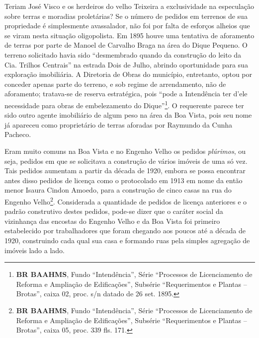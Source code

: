 Teriam José Visco e os herdeiros do velho Teixeira a exclusividade na especulação sobre terras e moradias proletárias? Se o número de pedidos em terrenos de sua propriedade é simplesmente avassalador, não foi por falta de esforços alheios que se viram nesta situação oligopolista. Em 1895 houve uma tentativa de aforamento de terras por parte de Manoel de Carvalho Braga na área do Dique Pequeno. O terreno solicitado havia sido ``desmembrado quando da construção do leito da Cia. Trilhos Centrais'' na estrada Dois de Julho, abrindo oportunidade para sua exploração imobiliária. A Diretoria de Obras do município, entretanto, optou por conceder apenas parte do terreno, e sob regime de arrendamento, não de aforamento; tratava-se de reserva estratégica, pois ``pode a Intendência ter d'ele necessidade para obras de embelezamento do Dique''\footnote{\textbf{BR BAAHMS}, Fundo ``Intendência'', Série ``Processos de Licenciamento de Reforma e Ampliação de Edificações'', Subsérie ``Requerimentos e Plantas -- Brotas'', caixa 02, proc. s/n datado de 26 set. 1895.}. O requerente parece ter sido outro agente imobiliário de algum peso na área da Boa Vista, pois seu nome já apareceu como proprietário de terras aforadas por Raymundo da Cunha Pacheco.


Eram muito comuns na Boa Vista e no Engenho Velho os pedidos \textit{plúrimos}, ou seja, pedidos em que se solicitava a construção de vários imóveis de uma só vez. Tais pedidos aumentam a partir da década de 1920, embora se possa encontrar antes disso pedidos de licença como o protocolado em 1913 em nome da então menor Isaura Cindon Amoedo, para a construção de cinco casas na rua do Engenho Velho\footnote{\textbf{BR BAAHMS}, Fundo ``Intendência'', Série ``Processos de Licenciamento de Reforma e Ampliação de Edificações'', Subsérie ``Requerimentos e Plantas -- Brotas'', caixa 05, proc. 339 fls. 171.}. Considerada a quantidade de pedidos de licença anteriores e o padrão construtivo destes pedidos, pode-se dizer que o caráter social da vizinhança das encostas do Engenho Velho e da Boa Vista foi primeiro estabelecido por trabalhadores que foram chegando aos poucos até a década de 1920, construindo cada qual sua casa e formando ruas pela simples agregação de imóveis lado a lado. 

